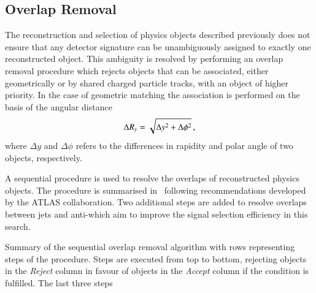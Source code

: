\subsection{Overlap Removal}
\label{sec:overlap_removal}

The reconstruction and selection of physics objects described
previously does not ensure that any detector signature can be
unambiguously assigned to exactly one reconstructed object. This
ambiguity is resolved by performing an overlap removal procedure which
rejects objects that can be associated, either geometrically or by
shared charged particle tracks, with an object of higher priority. In
the case of geometric matching the association is performed on the
basis of the angular distance
\begin{align*}
  \Delta R_y = \sqrt{\Delta y^2 + \Delta \phi^2} \,\text{,}
\end{align*}
where $\Delta y$ and $\Delta \phi$ refers to the differences in
rapidity and polar angle of two objects, respectively.

A sequential procedure is used to resolve the overlaps of
reconstructed physics objects. The procedure is summarised
in~ following recommendations developed by
the ATLAS collaboration. Two additional steps are added to resolve
overlaps between jets and anti-\tauhadvis which aim to improve the
signal selection efficiency in this search.

\begin{table}[htbp]
  \centering


  \caption{Summary of the sequential overlap removal algorithm with
    rows representing steps of the procedure. Steps are executed from
    top to bottom, rejecting objects in the \emph{Reject} column in
    favour of objects in the \emph{Accept} column if the condition is
    fulfilled. The last three steps }%
  \label{tab:overlap_removal}

  \resizebox{\textwidth}{!}{%
    
  }
\end{table}

